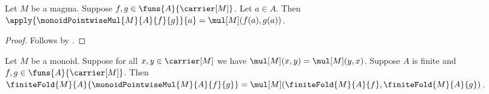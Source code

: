\begin{proposition}\label{monoid_pointwise_mul_apply}
    Let $M$ be a magma.
    Suppose $f,g\in\funs{A}{\carrier[M]}$.
    Let $a\in A$.
    Then
        $\apply{\monoidPointwiseMul{M}{A}{f}{g}}{a}
            =\mul[M](f(a),g(a))$.
\end{proposition}
\begin{proof}
    Follows by
        .
\end{proof}

\begin{theorem}\label{monoid_finite_fold_pointwise_mul}
    Let $M$ be a monoid.
    Suppose for all $x,y\in\carrier[M]$ we have
        $\mul[M](x,y)=\mul[M](y,x)$.
    Suppose $A$ is finite and $f,g\in\funs{A}{\carrier[M]}$.
    Then
        $\finiteFold{M}{A}{\monoidPointwiseMul{M}{A}{f}{g}}
            =\mul[M](\finiteFold{M}{A}{f},
                \finiteFold{M}{A}{g})$.
\end{theorem}
